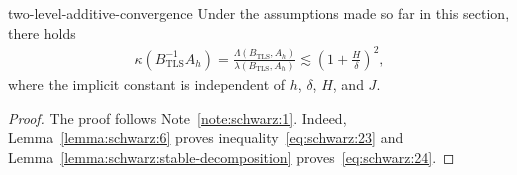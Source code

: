 \begin{Theorem}{two-level-additive-convergence}
  \label{theorem:schwarz:two-level-convergence}
  Under the assumptions made so far in this section, there holds
  \begin{gather}
    \label{eq:schwarz:14}
    \kappa(B^{-1}_{\text{TLS}} A_h)
    = \frac{\Lambda(B_{\text{TLS}}, A_h)}{\lambda(B_{\text{TLS}},
      A_h)}
    \lesssim \left(1+\frac H\delta\right)^2,
  \end{gather}
  where the implicit constant is independent of $h$, $\delta$, $H$, and $J$.
\end{Theorem}

\begin{proof}
  The proof follows Note~\ref{note:schwarz:1}. Indeed,
  Lemma~\ref{lemma:schwarz:6} proves inequality~\eqref{eq:schwarz:23}
  and Lemma~\ref{lemma:schwarz:stable-decomposition}
  proves~\eqref{eq:schwarz:24}.
\end{proof}

